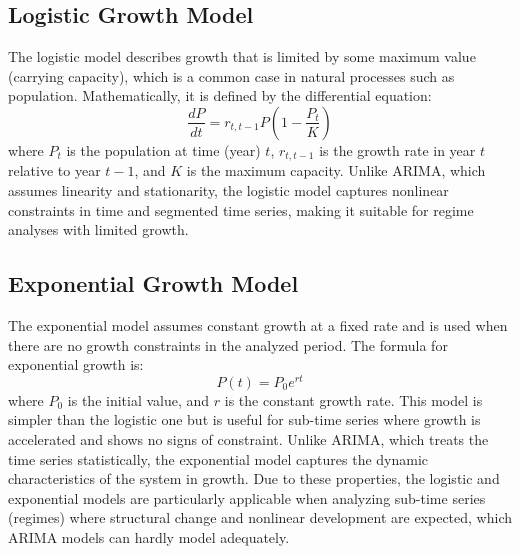 \documentclass[a4paper,11pt]{article}
\begin{document}
\subsection{Logistic Growth Model}
The logistic model describes growth that is limited by some maximum value (carrying capacity), which is a common case in natural processes such as population. Mathematically, it is defined by the differential equation:
$$
\frac{dP}{dt} = r_{t, t-1}P\left(1 - \frac{P_t}{K}\right)
$$
where $P_t$ is the population at time (year) $t$, $r_{t, t-1}$ is the growth rate in year $t$ relative to year $t-1$, and $K$ is the maximum capacity.
Unlike ARIMA, which assumes linearity and stationarity, the logistic model captures nonlinear constraints in time and segmented time series, making it suitable for regime analyses with limited growth.
\subsection{Exponential Growth Model}
The exponential model assumes constant growth at a fixed rate and is used when there are no growth constraints in the analyzed period. The formula for exponential growth is:
$$
P(t) = P_0 e^{rt}
$$
where $P_0$ is the initial value, and $r$ is the constant growth rate.
This model is simpler than the logistic one but is useful for sub-time series where growth is accelerated and shows no signs of constraint. Unlike ARIMA, which treats the time series statistically, the exponential model captures the dynamic characteristics of the system in growth.
Due to these properties, the logistic and exponential models are particularly applicable when analyzing sub-time series (regimes) where structural change and nonlinear development are expected, which ARIMA models can hardly model adequately.
\end{document}
